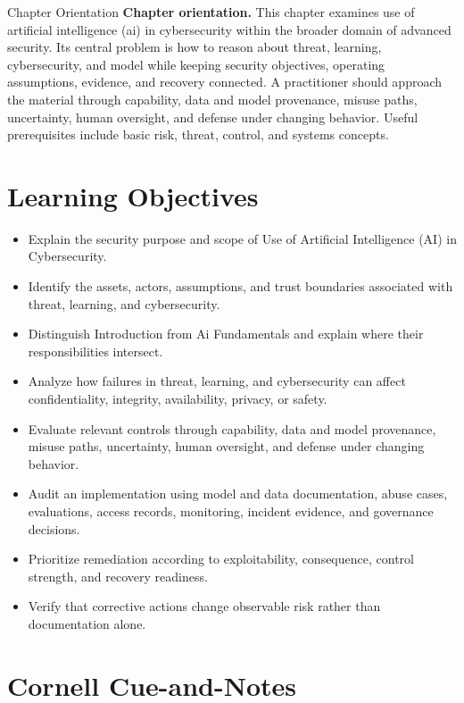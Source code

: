 \documentclass[11pt,letterpaper]{article}
\title{\CornellDocumentTitle}
\author{}
\date{}
\begin{document}
\maketitle
\begin{CornellOverviewBox}{Chapter Orientation}
\textbf{Chapter orientation.} This chapter examines use of artificial intelligence (ai) in cybersecurity within the broader domain of advanced security. Its central problem is how to reason about threat, learning, cybersecurity, and model while keeping security objectives, operating assumptions, evidence, and recovery connected. A practitioner should approach the material through capability, data and model provenance, misuse paths, uncertainty, human oversight, and defense under changing behavior. Useful prerequisites include basic risk, threat, control, and systems concepts.
\end{CornellOverviewBox}
\section*{Learning Objectives}
\begin{itemize}
\item Explain the security purpose and scope of Use of Artificial Intelligence (AI) in Cybersecurity.
\item Identify the assets, actors, assumptions, and trust boundaries associated with threat, learning, and cybersecurity.
\item Distinguish Introduction from Ai Fundamentals and explain where their responsibilities intersect.
\item Analyze how failures in threat, learning, and cybersecurity can affect confidentiality, integrity, availability, privacy, or safety.
\item Evaluate relevant controls through capability, data and model provenance, misuse paths, uncertainty, human oversight, and defense under changing behavior.
\item Audit an implementation using model and data documentation, abuse cases, evaluations, access records, monitoring, incident evidence, and governance decisions.
\item Prioritize remediation according to exploitability, consequence, control strength, and recovery readiness.
\item Verify that corrective actions change observable risk rather than documentation alone.
\end{itemize}
\section*{Cornell Cue-and-Notes}
\end{document}
